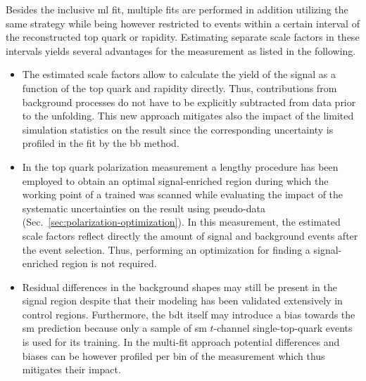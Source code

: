 

Besides the inclusive \gls{ml} fit, multiple fits are performed in addition utilizing the same strategy while being however restricted to events within a certain interval of the reconstructed top quark \pt or rapidity. Estimating separate scale factors in these intervals yields several advantages for the measurement as listed in the following.

\begin{itemize}
\item The estimated scale factors allow to calculate the yield of the signal as a function of the top quark \pt and rapidity directly. Thus, contributions from background processes do not have to be explicitly subtracted from data prior to the unfolding. This new approach mitigates also the impact of the limited simulation statistics on the result since the corresponding uncertainty is profiled in the fit by the \gls{bb} method.

\item In the top quark polarization measurement a lengthy procedure has been employed to obtain an optimal signal-enriched region during which the working point of a 
trained \bdt was scanned while evaluating the impact of the systematic uncertainties on the result using pseudo-data (Sec.~\ref{sec:polarization-optimization}). In this measurement, the estimated scale factors reflect directly the amount of signal and background events after the event selection. Thus, performing an optimization for finding a signal-enriched region is not required.

\item Residual differences in the background shapes may still be present in the signal region despite that their modeling has been validated extensively in control regions. Furthermore, the \gls{bdt} itself may introduce a bias towards the \gls{sm} prediction because only a sample of \gls{sm} $t$-channel single-top-quark events is used for its training. In the multi-fit approach potential differences and biases can be however profiled per bin of the measurement which thus mitigates their impact.
\end{itemize}


